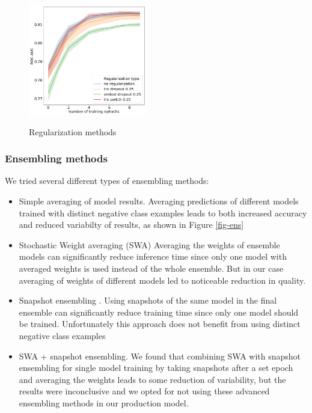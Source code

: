 \documentclass[sigconf]{acmart}
\begin{document}
\begin{figure}[ht]
  \caption{Regularization methods}
  \includegraphics[width=0.46\textwidth]{figures/do-pic.png}
  \label{fig-reg}
\end{figure}


\subsubsection{Ensembling methods}

We tried several different types of ensembling methods:
\begin{itemize}
\item Simple averaging of model results. Averaging predictions of different models trained with distinct negative class examples leads to both increased accuracy and reduced variabilty of results, as shown in Figure \ref{fig-ens}
\item Stochastic Weight averaging (SWA) \cite{DBLP:journals/corr/LoshchilovH16a}  Averaging the weights of ensemble models can significantly reduce inference time since only one model with averaged weights is used instead of the whole ensemble. But in our case averaging of weights of different models led to noticeable reduction in quality.
\item Snapshot ensembling \cite{DBLP:journals/corr/HuangLPLHW17}. Using snapshots of the same model in the final ensemble can significantly reduce training time since only one model should be trained. Unfortunately this approach does not benefit from using distinct negative class examples 
\item SWA + snapshot ensembling. We found that combining SWA with snapshot ensembling for single model training by taking snapshots after a set epoch and averaging the weights leads to some reduction of variability, but the results were inconclusive and we opted for not using these advanced ensembling methods in our production model.
\end{itemize}
\end{document}
